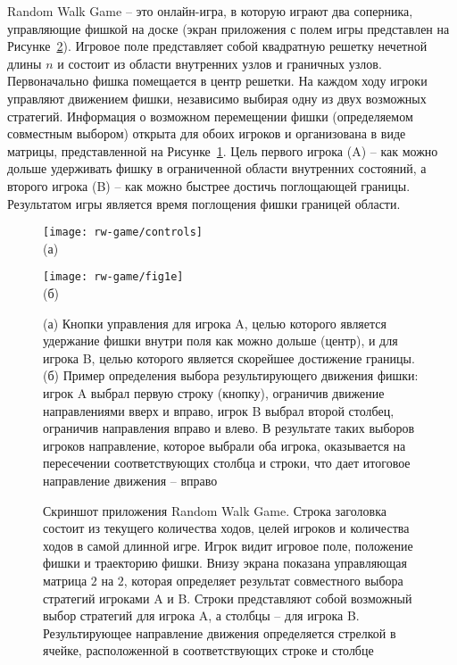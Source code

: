 Random Walk Game -- это онлайн-игра, в которую играют два соперника, управляющие фишкой на доске (экран приложения с полем игры представлен на Рисунке~\cref{fig:screenshot_game_field}). Игровое поле представляет собой квадратную решетку нечетной длины $n$ и состоит из области внутренних узлов и граничных узлов. Первоначально фишка помещается в центр решетки. На каждом ходу игроки управляют движением фишки, независимо выбирая одну из двух возможных стратегий. Информация о возможном перемещении фишки (определяемом совместным выбором) открыта для обоих игроков и организована в виде матрицы, представленной на Рисунке~\cref{fig:controls}. Цель первого игрока (A) -- как можно дольше удерживать фишку в ограниченной области внутренних состояний, а второго игрока (B) -- как можно быстрее достичь поглощающей границы. Результатом игры является время поглощения фишки границей области.
    
\begin{figure}[ht]
    \begin{minipage}[b][][b]{0.49\linewidth}\centering
        \texttt{[image: rw-game/controls]} \\ (а)
    \end{minipage}
    \hfill
    \begin{minipage}[b][][b]{0.49\linewidth}\centering
        \texttt{[image: rw-game/fig1e]} \\ (б)
    \end{minipage}
    \caption{
        (а) Кнопки управления для игрока A, целью которого является удержание фишки внутри поля как можно дольше (центр), и для игрока B, целью которого является скорейшее достижение границы. (б) Пример определения выбора результирующего движения фишки: игрок A выбрал первую строку (кнопку), ограничив движение направлениями вверх и вправо, игрок B выбрал второй столбец, ограничив направления вправо и влево. В результате таких выборов игроков направление, которое выбрали оба игрока, оказывается на пересечении соответствующих столбца и строки, что дает итоговое направление движения -- вправо
    }
    \label{fig:controls}
\end{figure}


\begin{figure}[!ht]
    \caption{
        Скриншот приложения Random Walk Game. Строка заголовка состоит из текущего количества ходов, целей игроков и количества ходов в самой длинной игре. Игрок видит игровое поле, положение фишки и траекторию фишки. Внизу экрана показана управляющая матрица $2$ на $2$, которая определяет результат совместного выбора стратегий игроками A и B. Строки представляют собой возможный выбор стратегий для игрока A, а столбцы -- для игрока B. Результирующее направление движения определяется стрелкой в ячейке, расположенной в соответствующих строке и столбце
    }\label{fig:screenshot_game_field}
\end{figure}


